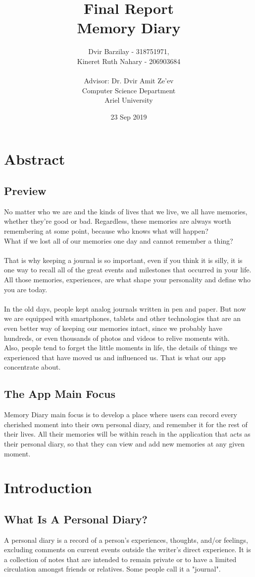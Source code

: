 \documentclass{article}
\title{\textbf{Final Report
\\{\Large Memory Diary}}}
\author{Dvir Barzilay - 318751971,\\ Kineret Ruth Nahary - 206903684 \\ \\
Advisor: Dr. Dvir Amit Ze'ev \\
Computer Science Department \\
Ariel University 
}
\date{23 Sep 2019}
\begin{document}
\maketitle
\newpage
\tableofcontents
\newpage
\section{Abstract}
\subsection{Preview}
No matter who we are and the kinds of lives that we live, we all have memories, whether they're good or bad. Regardless, these memories are always worth remembering at some point, because who knows what will happen?
\\
What if we lost all of our memories one day and cannot remember a thing?
\\\\
That is why keeping a journal is so important, even if you think it is silly, it is one way to recall all of the great events and milestones that occurred in your life. All those memories, experiences, are what shape your personality and define who you are today.
\\\\
In the old days, people kept analog journals written in pen and paper. But now we are equipped with smartphones, tablets and other technologies that are an even better way of keeping our memories intact, since we probably have hundreds, or even thousands of photos and videos to relive moments with.\\
Also, people tend to forget the little moments in life, the details of things we experienced that have moved us and influenced us. That is what our app concentrate about.
\subsection{The App Main Focus}
Memory Diary main focus is to develop a place where users can record every cherished moment into their own personal diary, and remember it for the rest of their lives. All their memories will be within reach in the application that acts as their personal diary, so that they can view and add new memories at any given moment.

\section{Introduction}
\subsection{What Is A Personal Diary?}
A personal diary is a record of a person's experiences, thoughts, and/or feelings, excluding comments on current events outside the writer's direct experience. It is a collection of notes that are intended to remain private or to have a limited circulation amongst friends or relatives. Some people call it a "journal".
\end{document}

